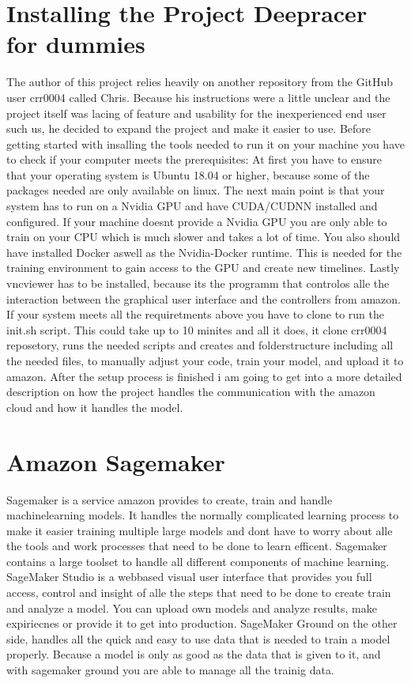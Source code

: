 \section{Installing the Project Deepracer for dummies}
The author of this project relies heavily on another repository from the GitHub user crr0004 called Chris. Because his instructions were a little unclear and the project itself was lacing of feature and usability for the inexperienced end user such us, he decided to expand the project and make it easier to use. 
Before getting started with insalling the tools needed to run it on your machine you have to check if your computer meets the prerequisites:
At first you have to ensure that your operating system is Ubuntu 18.04 or higher, because some of the packages needed are only available on linux.
The next main point is that your system has to run on a Nvidia GPU and have CUDA/CUDNN installed and configured. If your machine doesnt provide a Nvidia GPU you are only able to train on your CPU which is much slower and takes a lot of time.
You also should have installed Docker aswell as the Nvidia-Docker runtime. This is needed for the training environment to gain access to the GPU and create new timelines.
Lastly vncviewer  has to be installed, because its the programm that controlos alle the interaction between the graphical user interface and the controllers from amazon.
If your system meets all the requiretments above you have to clone to run the init.sh script.
This could take up to 10 minites and all it does, it clone crr0004 reposetory, runs the needed scripts and creates and folderstructure including all the needed files, to manually adjust your code, train your model, and upload it to amazon.
After the setup process is finished i am going to get into a more detailed description on how the project handles the communication with the amazon cloud and how it handles the model.

 \section{Amazon Sagemaker}
 Sagemaker is a service amazon provides to create, train and handle machinelearning models. It handles the normally complicated  learning process to make it easier training multiple large models and dont have to worry about alle the tools and work processes that need to be done to learn efficent. Sagemaker contains a large toolset to handle all different components of machine learning. 
 SageMaker Studio is a webbased visual user interface that provides you full access, control and insight of alle the steps that need to be done to create train and analyze a model. You can upload own models and analyze results, make expiriecnes or provide it to get into production. 
SageMaker Ground on the other side, handles all the quick and easy to use data that is needed to train a model properly. Because a model is only as good as the data that is given to it, and with sagemaker ground you are able to manage all the trainig data.

